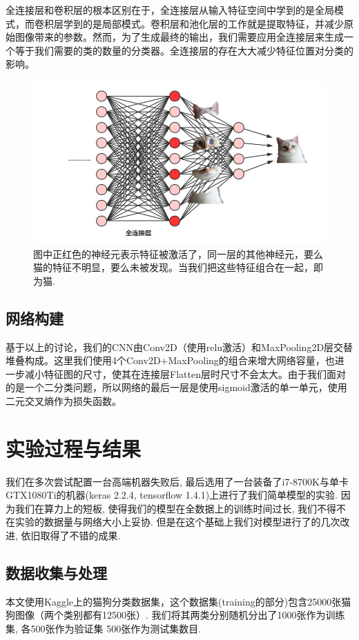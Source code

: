 \documentclass[lang=cn,11pt]{elegantpaper}
\begin{document}
全连接层和卷积层的根本区别在于，全连接层从输入特征空间中学到的是全局模式，而卷积层学到的是局部模式。卷积层和池化层的工作就是提取特征，并减少原始图像带来的参数。然而，为了生成最终的输出，我们需要应用全连接层来生成一个等于我们需要的类的数量的分类器。全连接层的存在大大减少特征位置对分类的影响。
\begin{figure}[hbtp]
\centering
  \includegraphics{densecat.png}
  \caption{图中正红色的神经元表示特征被激活了，同一层的其他神经元，要么猫的特征不明显，要么未被发现。当我们把这些特征组合在一起，即为猫. \label{fig:densecat1}}
\end{figure}


\subsection{网络构建}
基于以上的讨论，我们的CNN由Conv2D（使用relu激活）和MaxPooling2D层交替堆叠构成。这里我们使用4个Conv2D+MaxPooling的组合来增大网络容量，也进一步减小特征图的尺寸，使其在连接层Flatten层时尺寸不会太大。由于我们面对的是一个二分类问题，所以网络的最后一层是使用sigmoid激活的单一单元，使用二元交叉熵作为损失函数。


\section{实验过程与结果}

我们在多次尝试配置一台高端机器失败后, 最后选用了一台装备了i7-8700K与单卡GTX1080Ti的机器(keras 2.2.4, tensorflow 1.4.1)上进行了我们简单模型的实验. 因为我们在算力上的短板, 使得我们的模型在全数据上的训练时间过长, 我们不得不在实验的数据量与网络大小上妥协. 但是在这个基础上我们对模型进行了的几次改进, 依旧取得了不错的成果. 

\subsection{数据收集与处理}
本文使用Kaggle上的猫狗分类数据集，这个数据集(training的部分)包含25000张猫狗图像（两个类别都有12500张）. 我们将其两类分别随机分出了1000张作为训练集, 各500张作为验证集 500张作为测试集数目.
\end{document}
